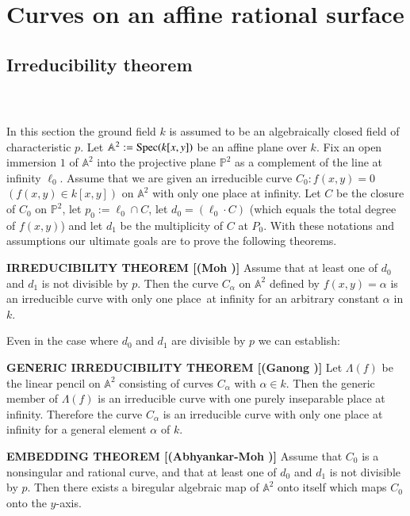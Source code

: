 \chapter{Curves on an affine rational surface}\label{chap2}

\section{Irreducibility theorem}\pageoriginale\ \label{chap2:sec1}

\subsection{}\label{chap2:1.1}
In this section the ground field $k$ is assumed to be an algebraically
closed field of characteristic $p$. Let
$\mathbb{A}^{2}:=\operatorname{Spec}(k[x,y])$ be an affine plane over $k$. Fix an
open immersion $1$ of $\mathbb{A}^{2}$ into the projective plane
$\mathbb{P}^{2}$ as a complement of the line at infinity
$\ell_{0}$. Assume that we are given an irreducible curve
$C_{0}:f(x,y)=0$ $(f(x,y)\in k[x,y])$ on $\mathbb{A}^{2}$ with only
one place at infinity. Let $C$ be the closure of $C_{0}$ on
$\mathbb{P}^{2}$, let $p_{0}:=\ell_{0}\cap C$, let
$d_{0}=(\ell_{0}\cdot C)$ (which equals the total degree of $f(x,y)$)
and let $d_{1}$ be the multiplicity of $C$ at $P_{0}$. With these
notations and assumptions our ultimate goals are to prove the
following theorems.

\noindent \textbf{IRREDUCIBILITY THEOREM [(\cf Moh \cite{38})]} 
Assume that at least one of $d_{0}$ and $d_{1}$ is not divisible by
$p$. Then the curve $C_{\alpha}$ on $\mathbb{A}^{2}$ defined by
$f(x,y)=\alpha$ is an irreducible curve with only one
place\pageoriginale\ at infinity for an arbitrary constant $\alpha$ in $k$.

Even in the case where $d_{0}$ and $d_{1}$ are divisible by $p$ we can
establish: 

\noindent \textbf{GENERIC IRREDUCIBILITY THEOREM [(\cf Ganong \cite{14})]}
Let $\Lambda(f)$ be the linear pencil on $\mathbb{A}^{2}$ consisting
of curves $C_{\alpha}$ with $\alpha\in k$. Then the generic member of
$\Lambda(f)$ is an irreducible curve with one purely inseparable place
at infinity. Therefore the curve $C_{\alpha}$ is an irreducible curve
with only one place at infinity for a general element $\alpha$ of $k$.

\noindent \textbf{EMBEDDING THEOREM [(\cf Abhyankar-Moh \cite{2})]}
Assume that $C_{0}$ is a nonsingular and rational curve, and that at
least one of $d_{0}$ and $d_{1}$ is not divisible by $p$. Then there
exists a biregular algebraic map of $\mathbb{A}^{2}$ onto itself which
maps $C_{0}$ onto the $y$-axis.

